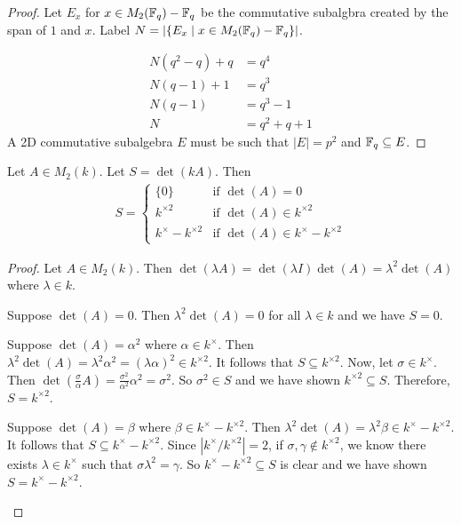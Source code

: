 \documentclass{amsart}
\begin{document}
\begin{proof}
    Let $E_x$ for $x \in M_2(\protect\mathbb{F}_q) - \protect\mathbb{F}_q$ be the commutative subalgbra created by the span of $1$ and $x$.
    Label $N = |\{E_x \mid x \in M_2(\protect\mathbb{F}_q) - \protect\mathbb{F}_q \}|$.

    \begin{align*}
        N(q^2 - q) + q &= q^4 \\
        N(q-1) + 1 &= q^3 \\
        N(q-1) &= q^3 - 1 \\
        N &= q^2 + q + 1
    \end{align*}
    A 2D commutative subalgebra $E$ must be such that $|E| = p^2$ and $\protect\mathbb{F}_q \subseteq E$.  
    
\end{proof}

\begin{lemma}
    Let $A \in M_2(k)$. Let $S = \det(kA)$. Then 
    \begin{align*}
        S =
        \begin{cases}
            \{0\}                     &\text{if } \det(A) = 0 \\
            k^{\times2}              &\text{if } \det(A) \in k^{\times2} \\
            k^{\times} - k^{\times2} &\text{if } \det(A) \in k^{\times} - k^{\times2}
        \end{cases}
    \end{align*}
\end{lemma}
\begin{proof}
    Let $A \in M_2(k)$. Then $\det(\lambda A) = \det(\lambda I)\det(A) = \lambda^2\det(A)$ where $\lambda \in k$. 
    \begin{Case}
        \item Suppose $\det(A) = 0$. Then $\lambda^2\det(A) = 0$ for all $\lambda \in k$ and we have $S = 0$.
        \item Suppose $\det(A) = \alpha^2$ where $\alpha \in k^{\times}$. Then $\lambda^2\det(A) = \lambda^2\alpha^2 = (\lambda\alpha)^2 \in k^{\times2}$. It follows that $S \subseteq k^{\times2}$. Now, let $\sigma \in k^{\times}$. Then $\det(\frac{\sigma}{\alpha}A) = \frac{\sigma^2}{\alpha^2}\alpha^2 = \sigma^2$. So $\sigma^2 \in S$ and we have shown $k^{\times2} \subseteq S$. Therefore, $S = k^{\times2}$.
        \item Suppose $\det(A) = \beta$ where $\beta \in k^{\times} - k^{\times2}$. Then $\lambda^2\det(A) = \lambda^2\beta \in k^{\times} - k^{\times2}$. It follows that $S \subseteq k^{\times} - k^{\times2}$. Since $|k^{\times}/k^{\times2}| = 2$, if $\sigma, \gamma \notin k^{\times2}$, we know there exists $\lambda \in k^{\times}$ such that $\sigma\lambda^2 = \gamma$. So $k^{\times} - k^{\times2} \subseteq S$ is clear and we have shown $S = k^{\times} - k^{\times2}$.
    \end{Case}
\end{proof}
\end{document}
